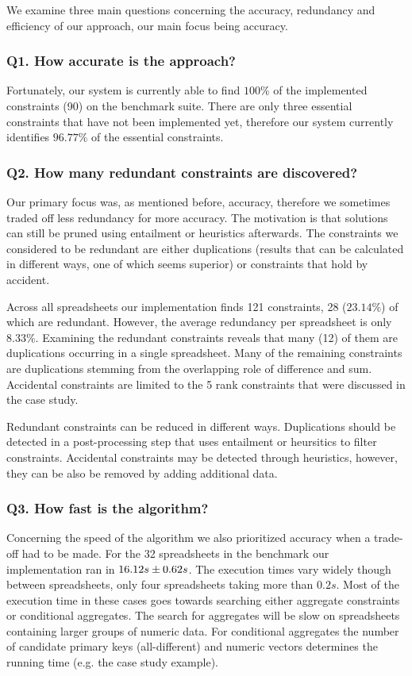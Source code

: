 \documentclass{sig-alternate-05-2015}
\begin{document}
We examine three main questions concerning the accuracy, redundancy and efficiency of our approach, our main focus being accuracy.

\subsubsection*{Q1. How accurate is the approach?}
Fortunately, our system is currently able to find $100\%$ of the implemented constraints (90) on the benchmark suite.
There are only three essential constraints that have not been implemented yet, therefore our system currently identifies $96.77\%$ of the essential constraints.

\subsubsection*{Q2. How many redundant constraints are discovered?}
Our primary focus was, as mentioned before, accuracy, therefore we sometimes traded off less redundancy for more accuracy.
The motivation is that solutions can still be pruned using entailment or heuristics afterwards.
The constraints we considered to be redundant are either duplications (results that can be calculated in different ways, one of which seems superior) or constraints that hold by accident.

Across all spreadsheets our implementation finds 121 constraints, 28 ($23.14\%$) of which are redundant.
However, the average redundancy per spreadsheet is only $8.33\%$.
Examining the redundant constraints reveals that many (12) of them are duplications occurring in a single spreadsheet.
Many of the remaining constraints are duplications stemming from the overlapping role of difference and sum.
Accidental constraints are limited to the 5 rank constraints that were discussed in the case study.

Redundant constraints can be reduced in different ways.
Duplications should be detected in a post-processing step that uses entailment or heursitics to filter constraints.
Accidental constraints may be detected through heuristics, however, they can be also be removed by adding additional data.

\subsubsection*{Q3. How fast is the algorithm?}
Concerning the speed of the algorithm we also prioritized accuracy when a trade-off had to be made.
For the 32 spreadsheets in the benchmark our implementation ran in ${16.12}s \pm {0.62}s$.
The execution times vary widely though between spreadsheets, only four spreadsheets taking more than $0.2s$.
Most of the execution time in these cases goes towards searching either aggregate constraints or conditional aggregates.
The search for aggregates will be slow on spreadsheets containing larger groups of numeric data.
For conditional aggregates the number of candidate primary keys (all-different) and numeric vectors determines the running time (e.g. the case study example).
\end{document}
